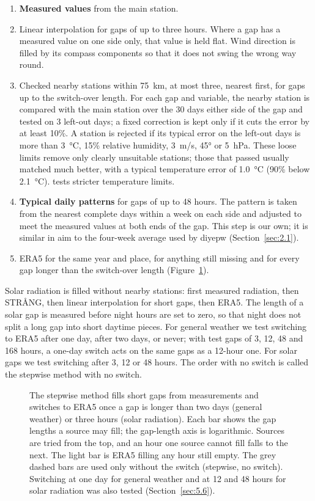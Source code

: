\begin{enumerate}
\item
  \textbf{Measured values} from the main station.
\item
  Linear interpolation for gaps of up to three hours. Where a gap has a measured value on one side only, that value is held flat. Wind direction is filled by its compass components so that it does not swing the wrong way round.
\item
  Checked nearby stations within 75~km, at most three, nearest first, for gaps up to the switch-over length. For each gap and variable, the nearby station is compared with the main station over the 30 days either side of the gap and tested on 3 left-out days; a fixed correction is kept only if it cuts the error by at least 10\%. A station is rejected if its typical error on the left-out days is more than 3~°C, 15\% relative humidity, 3~m/s, 45° or 5~hPa. These loose limits remove only clearly unsuitable stations; those that passed usually matched much better, with a typical temperature error of 1.0~°C (90\% below 2.1~°C).  tests stricter temperature limits.
\item
  \textbf{Typical daily patterns} for gaps of up to 48 hours. The pattern is taken from the nearest complete days within a week on each side and adjusted to meet the measured values at both ends of the gap. This step is our own; it is similar in aim to the four-week average used by diyepw (Section~\ref{sec:2.1}).
\item
  ERA5 for the same year and place, for anything still missing and for every gap longer than the switch-over length (Figure~\ref{fig:1}).
\end{enumerate}

Solar radiation is filled without nearby stations: first measured radiation, then STRÅNG, then linear interpolation for short gaps, then ERA5. The length of a solar gap is measured before night hours are set to zero, so that night does not split a long gap into short daytime pieces. For general weather we test switching to ERA5 after one day, after two days, or never; with test gaps of 3, 12, 48 and 168 hours, a one-day switch acts on the same gaps as a 12-hour one. For solar gaps we test switching after 3, 12 or 48 hours. The order with no switch is called the stepwise method with no switch.

\begin{figure}[tbp]
\centering
{}
\caption{The stepwise method fills short gaps from measurements and switches to ERA5 once a gap is longer than two days (general weather) or three hours (solar radiation). Each bar shows the gap lengths a source may fill; the gap-length axis is logarithmic. Sources are tried from the top, and an hour one source cannot fill falls to the next. The light bar is ERA5 filling any hour still empty. The grey dashed bars are used only without the switch (stepwise, no switch). Switching at one day for general weather and at 12 and 48 hours for solar radiation was also tested (Section~\ref{sec:5.6}).}
\label{fig:1}
\end{figure}

